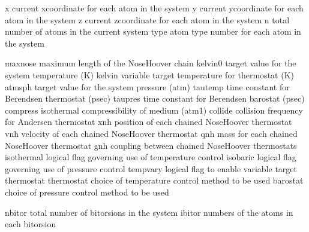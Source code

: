\documentclass[letterpaper,11pt,english]{sphinxmanual}
\begin{document}

\begin{sphinxVerbatim}[commandchars=\\\{\}]
x               current x\PYGZhy{}coordinate for each atom in the system
y               current y\PYGZhy{}coordinate for each atom in the system
z               current z\PYGZhy{}coordinate for each atom in the system
n               total number of atoms in the current system
type            atom type number for each atom in the system
\end{sphinxVerbatim}


\begin{sphinxVerbatim}[commandchars=\\\{\}]
maxnose         maximum length of the Nose\PYGZhy{}Hoover chain
kelvin0         target value for the system temperature (K)
kelvin          variable target temperature for thermostat (K)
atmsph          target value for the system pressure (atm)
tautemp         time constant for Berendsen thermostat (psec)
taupres         time constant for Berendsen barostat (psec)
compress        isothermal compressibility of medium (atm\PYGZhy{}1)
collide         collision frequency for Andersen thermostat
xnh             position of each chained Nose\PYGZhy{}Hoover thermostat
vnh             velocity of each chained Nose\PYGZhy{}Hoover thermostat
qnh             mass for each chained Nose\PYGZhy{}Hoover thermostat
gnh             coupling between chained Nose\PYGZhy{}Hoover thermostats
isothermal      logical flag governing use of temperature control
isobaric        logical flag governing use of pressure control
tempvary        logical flag to enable variable target thermostat
thermostat      choice of temperature control method to be used
barostat        choice of pressure control method to be used
\end{sphinxVerbatim}


\begin{sphinxVerbatim}[commandchars=\\\{\}]
nbitor          total number of bitorsions in the system
ibitor          numbers of the atoms in each bitorsion
\end{sphinxVerbatim}
\end{document}
